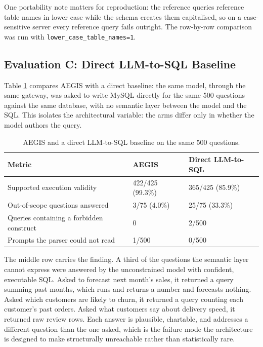 \documentclass[pdflatex,sn-mathphys-num]{sn-jnl}
\begin{document}
One portability note matters for reproduction: the reference queries reference table names in lower case while the schema creates them capitalised, so on a case-sensitive server every reference query fails outright. The row-by-row comparison was run with \texttt{lower\_case\_table\_names=1}.


\subsection{Evaluation C: Direct LLM-to-SQL Baseline}

Table \ref{tab:6} compares AEGIS with a direct baseline: the same model, through the same gateway, was asked to write MySQL directly for the same 500 questions against the same database, with no semantic layer between the model and the SQL. This isolates the architectural variable: the arms differ only in whether the model authors the query.


\begin{table}[t]
\caption{AEGIS and a direct LLM-to-SQL baseline on the same 500 questions.}
\label{tab:6}
\centering
\renewcommand{\arraystretch}{1.15}
\begin{tabular}{p{}ll}
\toprule
Metric & AEGIS & Direct LLM-to-SQL \\
\midrule
Supported execution validity & 422/425 (99.3\%) & 365/425 (85.9\%) \\
Out-of-scope questions answered & 3/75 (4.0\%) & 25/75 (33.3\%) \\
Queries containing a forbidden construct & 0 & 2/500 \\
Prompts the parser could not read & 1/500 & 0/500 \\
\bottomrule
\end{tabular}
\end{table}

The middle row carries the finding. A third of the questions the semantic layer cannot express were answered by the unconstrained model with confident, executable SQL. Asked to forecast next month's sales, it returned a query summing past months, which runs and returns a number and forecasts nothing. Asked which customers are likely to churn, it returned a query counting each customer's past orders. Asked what customers say about delivery speed, it returned raw review rows. Each answer is plausible, chartable, and addresses a different question than the one asked, which is the failure mode the architecture is designed to make structurally unreachable rather than statistically rare.
\end{document}
